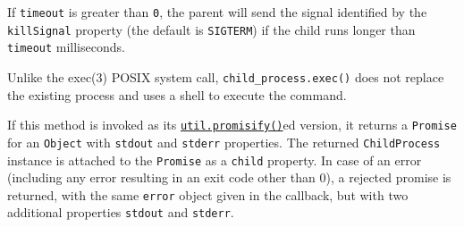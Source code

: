 \begin{Shaded}
\begin{Highlighting}[]
\OperatorTok{=} \NormalTok{(}\NormalTok{)}\OperatorTok{;}
\NormalTok{(}\OperatorTok{,}\OperatorTok{,}\OperatorTok{,}\KeywordTok{=\textgreater{}}\NormalTok{ \{}
    \NormalTok{(}\SpecialCharTok{$\{}\SpecialCharTok{\}}\VerbatimStringTok{\textasciigrave{}}\NormalTok{)}\OperatorTok{;}
    \OperatorTok{;}
\NormalTok{  \}}
  \NormalTok{(}\SpecialCharTok{$\{}\SpecialCharTok{\}}\VerbatimStringTok{\textasciigrave{}}\NormalTok{)}\OperatorTok{;}
  \NormalTok{(}\SpecialCharTok{$\{}\SpecialCharTok{\}}\VerbatimStringTok{\textasciigrave{}}\NormalTok{)}\OperatorTok{;}
\NormalTok{\})}\OperatorTok{;}
\end{Highlighting}
\end{Shaded}

If \texttt{timeout} is greater than \texttt{0}, the parent will send the
signal identified by the \texttt{killSignal} property (the default is
\texttt{\textquotesingle{}SIGTERM\textquotesingle{}}) if the child runs
longer than \texttt{timeout} milliseconds.

Unlike the exec(3) POSIX system call, \texttt{child\_process.exec()}
does not replace the existing process and uses a shell to execute the
command.

If this method is invoked as its
\href{util.md\#utilpromisifyoriginal}{\texttt{util.promisify()}}ed
version, it returns a \texttt{Promise} for an \texttt{Object} with
\texttt{stdout} and \texttt{stderr} properties. The returned
\texttt{ChildProcess} instance is attached to the \texttt{Promise} as a
\texttt{child} property. In case of an error (including any error
resulting in an exit code other than 0), a rejected promise is returned,
with the same \texttt{error} object given in the callback, but with two
additional properties \texttt{stdout} and \texttt{stderr}.

